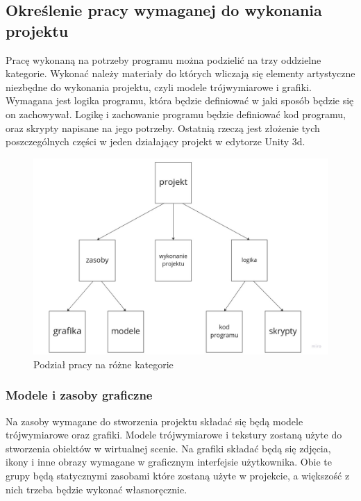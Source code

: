 \documentclass{article} %
\begin{document}
    \subsection{Określenie pracy wymaganej do wykonania projektu}
        Pracę wykonaną na potrzeby programu można podzielić na trzy oddzielne kategorie. Wykonać należy materiały do których wliczają się elementy artystyczne niezbędne do wykonania projektu, czyli modele trójwymiarowe i grafiki. Wymagana jest logika programu, która będzie definiować w jaki sposób będzie się on zachowywał. Logikę i zachowanie programu będzie definiować kod programu, oraz skrypty napisane na jego potrzeby. Ostatnią rzeczą jest złożenie tych poszczególnych części w jeden działający projekt w edytorze Unity 3d.
        \\
                
        \begin{figure}[h]
        \centering
        \includegraphics[bb=0 0 1224 816,scale=0.3,keepaspectratio=true]{images/diagrams/1 Project work categories.jpg}
        \caption{Podział pracy na różne kategorie}
        \end{figure}



        \subsubsection{Modele i zasoby graficzne}
            Na zasoby wymagane do stworzenia projektu składać się będą modele trójwymiarowe oraz grafiki. Modele trójwymiarowe i tekstury zostaną użyte do stworzenia obiektów w wirtualnej scenie. Na grafiki składać będą się zdjęcia, ikony i inne obrazy wymagane w graficznym interfejsie użytkownika. Obie te grupy będą statycznymi zasobami które zostaną użyte w projekcie, a większość z nich trzeba będzie wykonać własnoręcznie.
            \\
        
\end{document}

